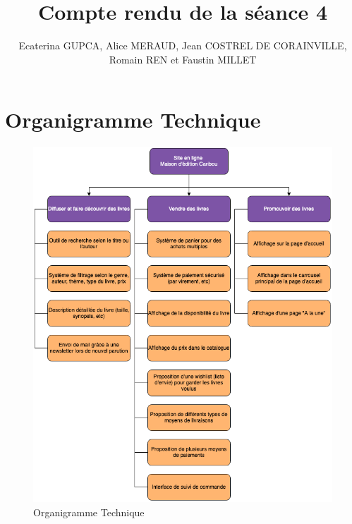 \documentclass[a4paper, 13pt]{article}
\begin{document}
\title{Compte rendu de la séance 4}
\author{Ecaterina GUPCA, Alice MERAUD, Jean COSTREL DE CORAINVILLE, Romain REN et Faustin MILLET}
\maketitle

\section{Organigramme Technique}
\begin{figure}[h]
    \centering
    \includegraphics[width=0.8\linewidth]{images/diag_technique.png}
    \caption{Organigramme Technique}
\end{figure}
\end{document}
